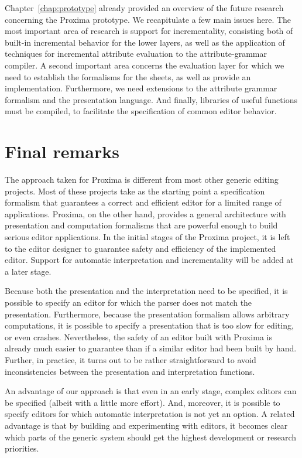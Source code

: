Chapter~\ref{chap:prototype} already provided an overview of the future research concerning the Proxima prototype. We recapitulate a few main issues here. The most important area of research is support for incrementality, consisting both of built-in incremental behavior for the lower layers, as well as the application of techniques for incremental attribute evaluation to the attribute-grammar compiler. A second important area concerns the evaluation layer for which we need to establish the formalisms for the sheets, as well as provide an implementation. Furthermore, we need extensions to the attribute grammar formalism and the {\Xprez} presentation language.  And finally, libraries of useful functions must be compiled, to facilitate the specification of common editor behavior.



\section{Final remarks}

% 
The approach taken for Proxima is different from most other generic editing projects. Most of these projects take as the starting point a specification formalism that guarantees a correct and efficient editor for a limited range of applications. Proxima, on the other hand, provides a general architecture with presentation and computation formalisms that are powerful enough to build serious editor applications. In the initial stages of the Proxima project, it is left to the editor designer to  guarantee safety and efficiency of the implemented editor. Support for automatic interpretation and incrementality  will be added at a later stage.

Because both the presentation and the interpretation need to be specified, it is possible to specify an editor for which the parser does not match the presentation. Furthermore, because the presentation formalism allows arbitrary computations, it is possible to specify a presentation that is too slow for editing, or even crashes.  Nevertheless, the safety of an editor built with Proxima is already much easier to guarantee than if a similar editor had been built by hand. Further, in practice, it turns out to be rather straightforward to avoid inconsistencies between the presentation and interpretation functions.

An advantage of our approach is that even in an early stage, complex editors can be specified (albeit with a little more effort). And, moreover, it is possible to specify editors for which automatic interpretation is not yet an option. A related advantage is that by building and experimenting with editors, it becomes clear which parts of the generic system should get the highest development or research priorities.

